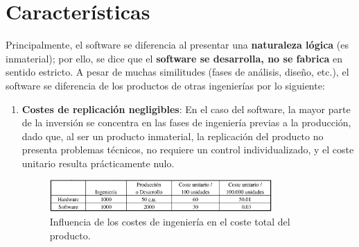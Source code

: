 \section{Características}
Principalmente, el software se diferencia al presentar una \textbf{naturaleza lógica} (es inmaterial); por ello, se dice que el \textbf{software se desarrolla, no se fabrica} en sentido estricto.  A pesar de muchas similitudes (fases de análisis, diseño, etc.), el software se diferencia de los productos de otras ingenierías por lo siguiente:
\begin{enumerate}

    \item \textbf{Costes de replicación negligibles}:
          En el caso del software, la mayor parte de la inversión se concentra en las fases de ingeniería previas a la producción, dado que, al ser un producto inmaterial, la replicación del producto no presenta problemas técnicos, no requiere un control individualizado, y el coste unitario resulta prácticamente nulo.
          \begin{figure}[h]
            \centering
            \includegraphics[width=0.8\textwidth]{Resources/Tema1/CostesProduccion.png}
            \caption{Influencia de los costes de ingeniería en el coste total del producto.}
        \end{figure}
          

\end{enumerate}
